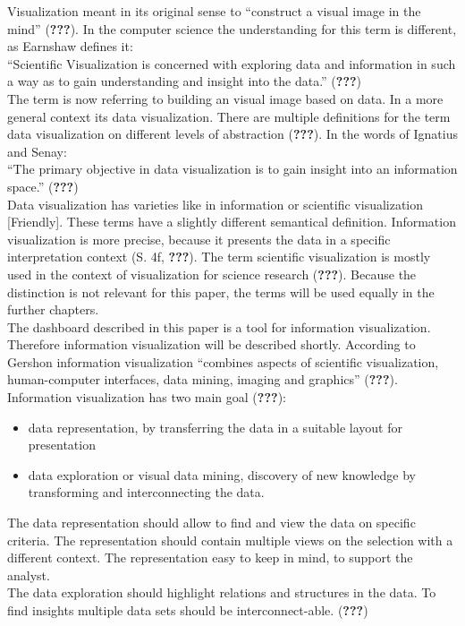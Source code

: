 \documentclass[american,a4paper,oneside,,tablecaptionabove]{scrbook}
\begin{document}
Visualization meant in its original sense to \enquote{construct a visual
image in the mind} ({\textbf{???}}). In the computer science the
understanding for this term is different, as Earnshaw defines it:\\
\enquote{Scientific Visualization is concerned with exploring data and
information in such a way as to gain understanding and insight into the
data.} ({\textbf{???}})\\
The term is now referring to building an visual image based on data. In
a more general context its data visualization. There are multiple
definitions for the term data visualization on different levels of
abstraction ({\textbf{???}}). In the words of Ignatius and Senay:\\
\enquote{The primary objective in data visualization is to gain insight
into an information space.} ({\textbf{???}})\\
Data visualization has varieties like in information or scientific
visualization {[}Friendly{]}. These terms have a slightly different
semantical definition. Information visualization is more precise,
because it presents the data in a specific interpretation context (S.
4f, {\textbf{???}}). The term scientific visualization is mostly used in
the context of visualization for science research ({\textbf{???}}).
Because the distinction is not relevant for this paper, the terms will
be used equally in the further chapters.\\
The dashboard described in this paper is a tool for information
visualization. Therefore information visualization will be described
shortly. According to Gershon information visualization
\enquote{combines aspects of scientific visualization, human-computer
interfaces, data mining, imaging and graphics} ({\textbf{???}}).\\
Information visualization has two main goal ({\textbf{???}}):

\begin{itemize}
\item
  data representation, by transferring the data in a suitable layout for
  presentation
\item
  data exploration or visual data mining, discovery of new knowledge by
  transforming and interconnecting the data.
\end{itemize}

The data representation should allow to find and view the data on
specific criteria. The representation should contain multiple views on
the selection with a different context. The representation easy to keep
in mind, to support the analyst.\\
The data exploration should highlight relations and structures in the
data. To find insights multiple data sets should be interconnect-able.
({\textbf{???}})
\end{document}
